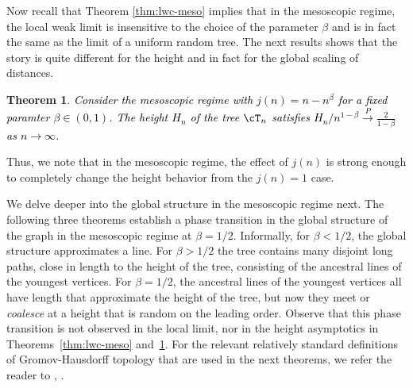 \documentclass[letterpaper,11pt,reqno]{amsart}
\newtheorem{thm}{Theorem}[section]
\theoremstyle{definition}
\newcommand{\convp}{\stackrel{P}{\longrightarrow}}
\begin{document}
Now recall that Theorem \ref{thm:lwc-meso} implies that in the mesoscopic regime,  the local weak limit is insensitive to the choice of the parameter $\beta$ and is in fact the same as the limit of a uniform random tree. The next results shows that the story is quite different for the height and in fact for the global scaling of distances. 
\begin{thm}\label{thm:ht_meso}
    \textcolor{black}{Consider the mesoscopic regime with $j(n)=n-n^{\beta}$ for a fixed paramter $\beta\in (0,1)$. The height $H_n$ of the tree $\cT_n$ satisfies $H_n/n^{1-\beta}\convp \frac{2}{1-\beta}$ as $n \to \infty$.}
\end{thm}
{Thus, we note that in the mesoscopic regime, the effect of $j(n)$ is strong enough to completely change the height behavior from the $j(n)=1$ case.}





{%
We delve deeper into the global structure in the mesoscopic regime next. The following three theorems establish a phase transition in the global structure of the graph in the mesoscopic regime at $\beta=1/2$. Informally, for $\beta<1/2$, the global structure approximates a line. For $\beta>1/2$ the tree contains many disjoint long paths, close in length to the height of the tree, consisting of the ancestral lines of the youngest vertices. For $\beta=1/2$, the ancestral lines of the youngest vertices all have length that approximate the height of the tree, but now they meet or \emph{coalesce} at a  height that is random on the leading order. Observe that this phase transition is not observed in the local limit, nor in the height asymptotics in Theorems~\ref{thm:lwc-meso} and~\ref{thm:ht_meso}. For the relevant relatively standard definitions of Gromov-Hausdorff topology that are used in the next theorems, we refer the reader to \cite{burago2001course}, \cite[Section 3]{gall2011scaling}. }%
\end{document}
